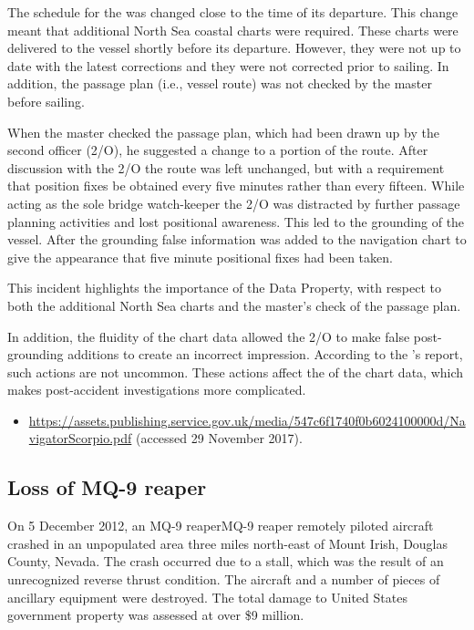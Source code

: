 The schedule for the  was changed close to the time of its departure. This change meant that additional North Sea coastal charts were required. These charts were delivered to the vessel shortly before its departure. However, they were not up to date with the latest corrections and they were not corrected prior to sailing. In addition, the passage plan (i.e., vessel route) was not checked by the master before sailing.

When the master checked the passage plan, which had been drawn up by the second officer (2/O), he suggested a change to a portion of the route. After discussion with the 2/O the route was left unchanged, but with a requirement that position fixes be obtained every five minutes rather than every fifteen. While acting as the sole bridge watch-keeper the 2/O was distracted by further passage planning activities and lost positional awareness. This led to the grounding of the vessel. After the grounding false information was added to the navigation chart to give the appearance that five minute positional fixes had been taken.

This incident highlights the importance of the  Data Property, with respect to both the additional North Sea charts and the master's check of the passage plan.

In addition, the fluidity of the chart data allowed the 2/O to make false post-grounding additions to create an incorrect impression. According to the 's report, such actions are not uncommon. These actions affect the  of the chart data, which makes post-accident investigations more complicated.

\begin{samepage}
\begin{itemize}
  \item \raggedright{\href{https://assets.publishing.service.gov.uk/media/547c6f1740f0b6024100000d/NavigatorScorpio.pdf}{https://assets.publishing.service.gov.uk/media/547c6f1740f0b6024100000d/NavigatorScorpio.pdf} (accessed 29 November 2017).}
\end{itemize}
\end{samepage}


\subsection{Loss of MQ-9 reaper} \label{bkm:incacc:mq9reaper}
On 5 December 2012, an MQ-9 reaperMQ-9 reaper remotely piloted aircraft crashed in an unpopulated area three miles north-east of Mount Irish, Douglas County, Nevada. The crash occurred due to a stall, which was the result of an unrecognized reverse thrust condition. The aircraft and a number of pieces of ancillary equipment were destroyed. The total damage to United States government property was assessed at over \$9 million.

